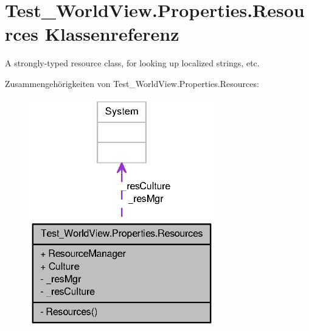 \hypertarget{class_test___world_view_1_1_properties_1_1_resources}{
\section{Test\_\-WorldView.Properties.Resources Klassenreferenz}
\label{class_test___world_view_1_1_properties_1_1_resources}
}


A strongly-\/typed resource class, for looking up localized strings, etc.  




Zusammengehörigkeiten von Test\_\-WorldView.Properties.Resources:\nopagebreak
\begin{figure}[H]
\begin{center}
\leavevmode
\includegraphics[width=228pt]{class_test___world_view_1_1_properties_1_1_resources__coll__graph}
\end{center}
\end{figure}
